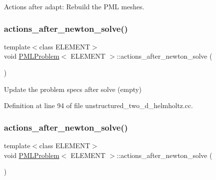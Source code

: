 Actions after adapt\+: Rebuild the P\+ML meshes. 

\mbox{\label{classPMLProblem_ac171a6a2ff881984b3e057036cbbc414}} 
\subsubsection{\texorpdfstring{actions\+\_\+after\+\_\+newton\+\_\+solve()}{actions\_after\_newton\_solve()}\hspace{0.1cm}{\footnotesize\ttfamily [1/2]}}
{\footnotesize\ttfamily template$<$class E\+L\+E\+M\+E\+NT$>$ \\
void \hyperlink{classPMLProblem}{P\+M\+L\+Problem}$<$ E\+L\+E\+M\+E\+NT $>$\+::actions\+\_\+after\+\_\+newton\+\_\+solve (\begin{DoxyParamCaption}{ }\end{DoxyParamCaption})\hspace{0.3cm}{\ttfamily [inline]}}



Update the problem specs after solve (empty) 



Definition at line 94 of file unstructured\+\_\+two\+\_\+d\+\_\+helmholtz.\+cc.

\mbox{\label{classPMLProblem_ac171a6a2ff881984b3e057036cbbc414}} 
\subsubsection{\texorpdfstring{actions\+\_\+after\+\_\+newton\+\_\+solve()}{actions\_after\_newton\_solve()}\hspace{0.1cm}{\footnotesize\ttfamily [2/2]}}
{\footnotesize\ttfamily template$<$class E\+L\+E\+M\+E\+NT$>$ \\
void \hyperlink{classPMLProblem}{P\+M\+L\+Problem}$<$ E\+L\+E\+M\+E\+NT $>$\+::actions\+\_\+after\+\_\+newton\+\_\+solve (\begin{DoxyParamCaption}{ }\end{DoxyParamCaption})\hspace{0.3cm}{\ttfamily [inline]}}



